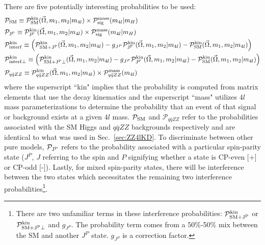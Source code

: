 There are five potentially interesting probabilities to be used:
\begin{align}
& {\mathcal{P}}_{\rm SM} \equiv {\mathcal{P}}^{\rm kin}_{\rm SM} (\vec\Omega, m_1, m_2|m_{4l}) \times {\mathcal{P}}^{\rm mass}_{\rm sig} (m_{4l}|m_H) \nonumber \\
& {\mathcal{P}}_{\rm J^P} \equiv {\mathcal{P}}^{\rm kin}_{\rm J^P} (\vec\Omega, m_1, m_2|m_{4l}) \times {\mathcal{P}}^{\rm mass}_{\rm sig} (m_{4l}|m_H) \nonumber \\
& {\mathcal{P}}^{\rm kin}_{\rm interf} \equiv \left({\mathcal{P}}^{\rm kin}_{\rm SM + J^P}(\vec\Omega, m_1, m_2|m_{4l}) - g_{J^P}{\mathcal{P}}^{\rm kin}_{\rm J^P}(\vec\Omega, m_1, m_2|m_{4l}) - {\mathcal{P}}^{\rm kin}_{\rm SM}(\vec\Omega, m_1, m_2|m_{4l}
) \right) \nonumber \\
& {\mathcal{P}}^{\rm kin}_{\rm interf \perp} \equiv \left({\mathcal{P}}^{\rm kin}_{\rm SM + J^P \perp}(\vec\Omega, m_1, m_2|m_{4l}) - g_{J^P}{\mathcal{P}}^{\rm kin}_{\rm J^P}(\vec\Omega, m_1, m_2|m_{4l}) - {\mathcal{P}}^{\rm kin}_{\rm SM}(\vec\Omega, m_1, m
_2|m_{4l}) \right) \nonumber \\
& {\mathcal{P}}_{q\bar{q}ZZ} \equiv {\mathcal{P}}^{\rm kin}_{q\bar{q}ZZ} (\vec\Omega, m_1, m_2|m_{4l}) \times {\mathcal{P}}^{\rm mass}_{q\bar{q}ZZ} (m_{4l}) \nonumber
\end{align}
where the superscript ``kin" implies that the probability is computed from matrix elements that use the decay kinematics and the superscript ``mass" utilizes $4l$ mass parameterizations to determine the probability that an event of that signal or background exists at a given $4l$ mass. ${\mathcal{P}}_{\rm SM}$ and ${\mathcal{P}}_{q\bar{q}ZZ}$ refer to the probabilities associated with the SM Higgs and $q\bar{q}ZZ$ backgrounds respectively and are identical to what was used in Sec.~\ref{sec:ZZ4lKD}. To discriminate between other pure models, ${\mathcal{P}}_{\rm J^P}$ refers to the probability associated with a particular spin-parity state ($J^P$, $J$ referring to the spin and $P$ signifying whether a state is CP-even [+] or CP-odd [-]). Lastly, for mixed spin-parity states, there will be interference between the two states which necessitates the remaining two interference probabilities\footnote{There are two unfamiliar terms in these interference probabilities: ${\mathcal{P}}^{\rm kin}_{\rm SM + J^P}$ or ${\mathcal{P}}^{\rm kin}_{\rm SM + J^P \perp}$ and $g_{J^P}$. The probability term comes from a 50\%-50\% mix between the SM and another $J^P$ state. $g_{J^P}$ is a correction factor.}.

